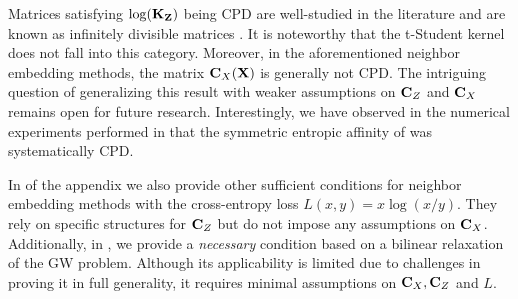 Matrices satisfying $\log({\mathbf{K}}_{\mathbf{Z}})$ being CPD are well-studied in the literature
and are known as infinitely divisible matrices \cite{bhatia2006infinitely}. It
is noteworthy that the t-Student kernel does not fall into this category.
Moreover,  in the aforementioned neighbor embedding methods, the matrix
${\mathbf{C}}_{X}({\mathbf{X}})$ is generally not CPD. The intriguing question of generalizing this
result with weaker assumptions on ${\mathbf{C}}_{Z}$ and ${\mathbf{C}}_{X}$ remains open for future
research. Interestingly, we have observed in the numerical experiments performed in  that the
symmetric entropic affinity of \citet{van2023snekhorn} was systematically CPD. 

\begin{remark}
In  of the appendix we also provide other sufficient conditions for neighbor embedding methods with the cross-entropy loss $L(x,y) = x \log(x/y)$. They rely on specific structures for ${\mathbf{C}}_{Z}$ but do not impose any assumptions on ${\mathbf{C}}_{X}$. Additionally, in , we provide a \emph{necessary} condition based on a bilinear relaxation of the GW problem. Although its applicability is limited due to challenges in proving it in full generality, it requires minimal assumptions on ${\mathbf{C}}_{X}, {\mathbf{C}}_{Z}$ and $L$.
\end{remark} 








